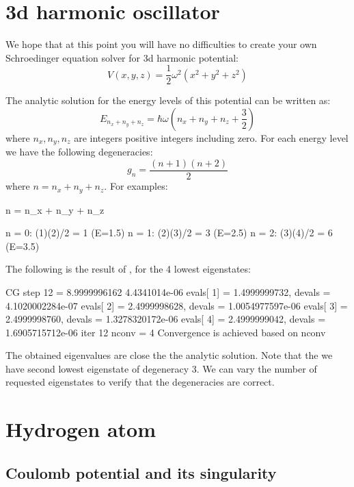 \section{3d harmonic oscillator}

We hope that at this point you will have no difficulties to create your own
Schroedinger equation solver for 3d harmonic potential:
\begin{equation}
V(x,y,z) = \frac{1}{2}\omega^2 \left( x^2 + y^2 + z^2 \right)
\end{equation}

The analytic solution for the energy levels of this potential can be written as:
\begin{equation}
E_{n_{x} + n_{y} + n_{z}} = \hbar \omega \left( n_{x} + n_{y} + n_{z} + \frac{3}{2} \right)
\end{equation}
where $n_x, n_y, n_z$ are integers positive integers including zero.
%
For each energy level we have the following degeneracies:
\begin{equation}
g_{n} = \frac{(n + 1)(n + 2)}{2}
\end{equation}
where $n = n_x + n_y + n_z$.
%
For examples:
\begin{textcode}
n = n_x + n_y + n_z

n = 0: (1)(2)/2 = 1  (E=1.5)
n = 1: (2)(3)/2 = 3  (E=2.5)
n = 2: (3)(4)/2 = 6  (E=3.5)
\end{textcode}

The following is the result of , for the 4 lowest eigenstates:
\begin{textcode}
CG step       12 =       8.9999996162 4.4341014e-06
evals[  1] =       1.4999999732, devals =   4.1020002284e-07
evals[  2] =       2.4999998628, devals =   1.0054977597e-06
evals[  3] =       2.4999998760, devals =   1.3278320172e-06
evals[  4] =       2.4999999042, devals =   1.6905715712e-06
iter 12 nconv = 4
Convergence is achieved based on nconv    
\end{textcode}
%
The obtained eigenvalues are close the the analytic solution.
Note that the we have second lowest eigenstate of degeneracy 3.
We can vary the number of requested eigenstates to verify that the degeneracies are
correct.


\section{Hydrogen atom}

\subsection{Coulomb potential and its singularity}

